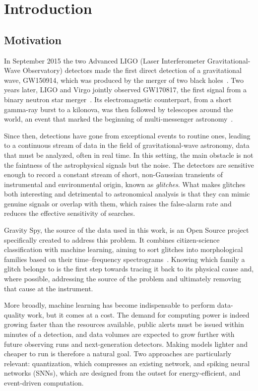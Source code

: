 \chapter{Introduction}
\label{ch:introduction}

\section{Motivation}

In September 2015 the two Advanced LIGO (Laser Interferometer Gravitational-Wave
Observatory) detectors made the first direct detection of a gravitational wave,
GW150914, which was produced by the merger of two black holes~\cite{abbott2016gw150914}.
Two years later, LIGO and Virgo jointly observed GW170817, the first signal from a
binary neutron star merger~\cite{abbott2017gw170817}. Its electromagnetic
counterpart, from a short gamma-ray burst to a kilonova, was then followed by
telescopes around the world, an event that marked the beginning of multi-messenger
astronomy~\cite{abbott2017multimessenger}.

Since then, detections have gone from exceptional events to routine ones, leading
to a continuous stream of data in the field of gravitational-wave astronomy,
data that must be analyzed, often in real time. In this setting, the main obstacle is not the
faintness of the astrophysical signals but the noise. The detectors are sensitive
enough to record a constant stream of short, non-Gaussian transients of
instrumental and environmental origin, known as \emph{glitches}. What makes
glitches both interesting and detrimental to astronomical analysis is that they can mimic
genuine signals or overlap with them, which raises the false-alarm rate and reduces
the effective sensitivity of searches.

Gravity Spy, the source of the data used in this work, is an Open Source project
specifically created to address this problem.
It combines citizen-science classification with machine learning, aiming to
sort glitches into morphological families based on their time--frequency
spectrograms~\cite{zevin2017}.
Knowing which family a glitch belongs to is the first step towards tracing it back
to its physical cause and, where possible, addressing the source of the problem
and ultimately removing that cause at the instrument.

More broadly, machine learning has become indispensable to perform data-quality work, but
it comes at a cost. The demand for computing power is indeed growing faster than the
resources available, public alerts must be issued within minutes of a detection,
and data volumes are expected to grow further with future observing runs and next-generation
detectors. Making models lighter and cheaper to run is therefore a natural goal.
Two approaches are particularly relevant: quantization, which compresses an
existing network, and spiking neural networks (SNNs), which are designed from the outset
for energy-efficient, and event-driven computation.


